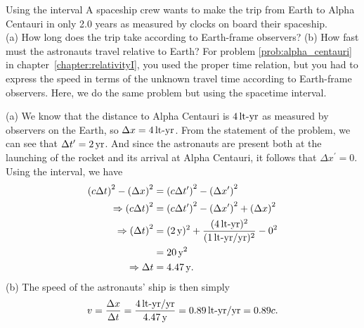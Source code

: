 \begin{example}{Using the interval} 
  A spaceship crew wants to make the trip from Earth to Alpha Centauri
  in only 2.0 years as measured by clocks on board their spaceship.\\
  (a) How long does the trip take according to Earth-frame observers?
  (b) How fast must the astronauts travel relative to Earth?
  \solution For problem \ref{prob:alpha_centauri} in
  chapter~\ref{chapter:relativityI}, you used the proper time relation,
  but you had to express the speed in terms of the unknown travel time
  according to Earth-frame observers.  Here, we do the same problem
  but using the spacetime interval.

  \noindent (a) We know that the distance to Alpha Centauri is 
  $4\,\mbox{lt-yr}$ as measured by observers on the Earth, so $\Delta x =
  4\,\mbox{lt-yr}$.  From the statement of the problem, we can see that
  $\Delta t^\prime = 2\,\mbox{yr}$.  And since the astronauts are
  present both at the launching of the rocket and its arrival at Alpha
  Centauri, it follows that $\Delta x^\prime = 0$.  Using the
  interval, we have
\begin{align}
\left(c\Delta t\right)^2 - \left(\Delta x\right)^2 &= 
   \left(c\Delta t^\prime\right)^2 -\left(\Delta x^\prime\right)^2 \nonumber \\
\Rightarrow \left(c\Delta t\right)^2 &= \left(c\Delta t^\prime\right)^2 - 
     \left(\Delta x^\prime\right)^2 + \left(\Delta x\right)^2 \nonumber \\
\Rightarrow \left(\Delta t\right)^2 &= (2\,\mbox{y})^2 + 
                         \frac{(4\,\mbox{lt-yr})^2}{(1\,\mbox{lt-yr/yr})^2} - 0^2
                                                          \nonumber \\
                                  &= 20\,\mbox{y}^2    \nonumber \\
\Rightarrow \Delta t &= 4.47\,\mbox{y}. \nonumber
\end{align}
(b) The speed of the astronauts' ship is then simply
\begin{equation}
  v = \frac{\Delta x}{\Delta t} =
  \frac{4\,\mbox{lt-yr/yr}}{4.47\,\mbox{y}}  
   = 0.89\,\mbox{lt-yr/yr} = 0.89c.
\end{equation}
\label{example:intervals-causality}
\end{example}

